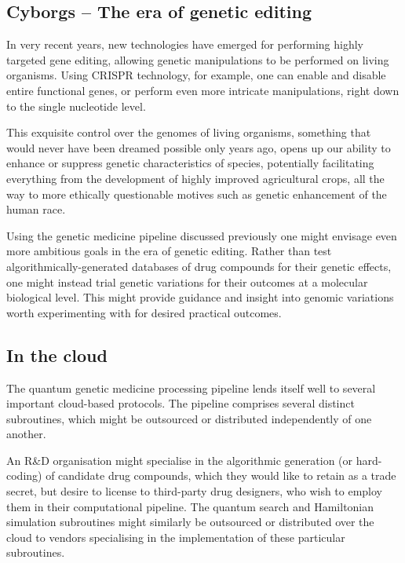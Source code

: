 %
%

\subsection{Cyborgs -- The era of genetic editing}

In very recent years, new technologies have emerged for performing highly targeted gene editing, allowing genetic manipulations to be performed on living organisms. Using CRISPR technology, for example, one can enable and disable entire functional genes, or perform even more intricate manipulations, right down to the single nucleotide level.

This exquisite control over the genomes of living organisms, something that would never have been dreamed possible only years ago, opens up our ability to enhance or suppress genetic characteristics of species, potentially facilitating everything from the development of highly improved agricultural crops, all the way to more ethically questionable motives such as genetic enhancement of the human race.

Using the genetic medicine pipeline discussed previously one might envisage even more ambitious goals in the era of genetic editing. Rather than test algorithmically-generated databases of drug compounds for their genetic effects, one might instead trial genetic variations for their outcomes at a molecular biological level. This might provide guidance and insight into genomic variations worth experimenting with for desired practical outcomes.

%
%

\subsection{In the cloud}

The quantum genetic medicine processing pipeline lends itself well to several important cloud-based protocols. The pipeline comprises several distinct subroutines, which might be outsourced or distributed independently of one another.

An R\&D organisation might specialise in the algorithmic generation (or hard-coding) of candidate drug compounds, which they would like to retain as a trade secret, but desire to license to third-party drug designers, who wish to employ them in their computational pipeline. The quantum search and Hamiltonian simulation subroutines might similarly be outsourced or distributed over the cloud to vendors specialising in the implementation of these particular subroutines.

